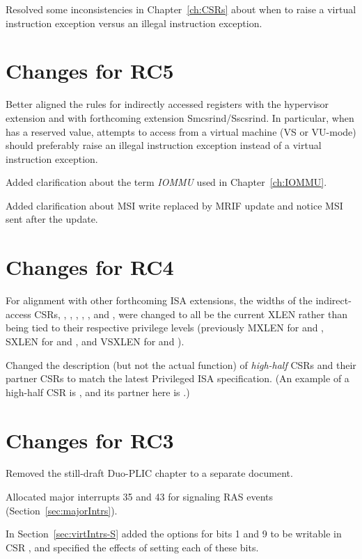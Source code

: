 Resolved some inconsistencies in Chapter~\ref{ch:CSRs}
about when to raise a virtual instruction exception
versus an illegal instruction exception.

\section*{Changes for RC5}

Better aligned the rules for indirectly accessed registers with the
hypervisor extension and with forthcoming extension Smcsrind/Sscsrind.
In particular, when  has a reserved value, attempts
to access  from a virtual machine (VS or \mbox{VU-mode})
should preferably raise an illegal instruction exception
instead of a virtual instruction exception.

Added clarification about the term \emph{\mbox{IOMMU}}
used in Chapter~\ref{ch:IOMMU}.

Added clarification about MSI write replaced by MRIF update and
notice MSI sent after the update.

\section*{Changes for RC4}

For alignment with other forthcoming {\RISCV} ISA extensions,
the widths of the indirect-access CSRs, , ,
, , , and , were
changed to all be the current XLEN rather than being tied to
their respective privilege levels (previously MXLEN for
 and , SXLEN for  and ,
and VSXLEN for  and ).

Changed the description (but not the actual function)
of \emph{high-half} CSRs and their partner CSRs
to match the latest {\RISCV} Privileged ISA specification.
(An example of a high-half CSR is ,
and its partner here is .)

\section*{Changes for RC3}

Removed the still-draft Duo-PLIC chapter to a separate document.

Allocated major interrupts 35 and 43 for signaling RAS events
(Section~\ref{sec:majorIntrs}).

In Section~\ref{sec:virtIntrs-S} added the options
for bits 1 and 9 to be writable in CSR ,
and specified the effects of setting each of these bits.

